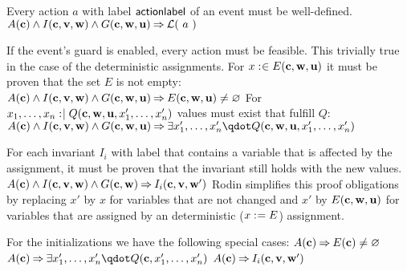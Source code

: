 Every action $a$ with label $\textsf{actionlabel}$ of an event must be well-defined.
  {}%
  {$A(\allconstants) \land I(\allconstants,\allvariables) \land G(\allconstants,\concvariables,\concparameters) \limp %
    \wdl(~a~)$}
  

If the event's guard is enabled, every action must be feasible.
  This trivially true in the case of the deterministic assignments.
  For $x \mathrel{:\mkern1mu\in} E(\textbf{c},\textbf{w},\textbf{u})$ it must be proven that the
  set $E$ is not empty:
  {$A(\allconstants) \land I(\allconstants,\allvariables) \land G(\allconstants,\concvariables,\concparameters) \limp %
    E(\allconstants,\concvariables,\concparameters) \neq \emptyset$}
  For $x_1,\ldots,x_n \mathrel{:\mkern1mu\mid} Q(\textbf{c},\textbf{w},\textbf{u},x_1',\ldots,x_n')$
  values must exist that fulfill $Q$:
  {$A(\allconstants) \land I(\allconstants,\allvariables) \land G(\allconstants,\concvariables,\concparameters) \limp %
    \exists x_1',\ldots,x_n' \qdot Q(\allconstants,\concvariables,\concparameters,x_1',\ldots,x_n')$}  

For each invariant $I_i$ with label  
  that contains a variable that is affected by the assignment, it must be proven
  that the invariant still holds with the new values.
  {}%
  {$A(\textbf{c}) \land I(\textbf{c},{\textbf{v},\textbf{w}}) \land G(\textbf{c},\textbf{w}) \mathbin\Rightarrow I_i(\textbf{c},{\textbf{v},\textbf{w}}')$}
  Rodin simplifies this proof obligations by replacing $x'$ by $x$ for variables that are not
  changed and $x'$ by $E(\textbf{c},\textbf{w},\textbf{u})$ 
  for variables that are assigned by an deterministic ($x \mathrel{:\mkern1mu=} E$) assignment.

For the initializations we have the following special cases:
  {$A(\textbf{c}) \mathbin\Rightarrow  E(\textbf{c}) \neq \mathord\varnothing$}
  {$A(\allconstants) \limp \exists x_1',\ldots,x_n' \qdot Q(\allconstants,x_1',\ldots,x_n')$}  
  {}%
  {$A(\textbf{c}) \mathbin\Rightarrow I_i(\textbf{c},{\textbf{v},\textbf{w}}')$}


